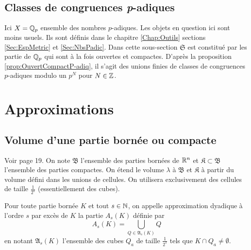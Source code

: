 \subsection{Classes de congruences \emph{p}-adiques}
Ici $X=\mathbb{Q}_p$ ensemble des nombres $p$-adiques. Les objets en question ici sont moins usuels. Ils sont définis dans le chapitre \ref{Chap:Outils} sections \ref{Sec:EspMetric} et \ref{Sec:NbsPadic}.\newline
Dans cette sous-section $\mathfrak{S}$ est constitué par les partie de $\mathbb{Q}_p$ qui sont à la fois ouvertes et compactes. D'après la proposition \ref{prop:OuvertCompactP-adiq}, il s'agit des unions finies de classes de congruences $p$-adiques modulo un $p^N$ pour $N\in \mathbb{Z}$.


\section{Approximations}\label{Sec:Approximations}

\subsection{Volume d'une partie bornée ou compacte}\label{SubSecc:Volume}
\noindent Voir page 19. On note $\mathfrak{B}$ l'ensemble des parties bornées  de $\mathbb{R}^n$ et $\mathfrak{K} \subset \mathfrak{B}$ l'ensemble des parties compactes. On étend le volume $\lambda$ à $\mathfrak{B}$ et $\mathfrak{K}$ à partir du volume défini dans les unions de cellules. On utilisera exclusivement des cellules de taille $\frac{1}{2^s}$ (essentiellement des cubes).
\begin{defi}
  Pour toute partie bornée $K$ et tout $s\in \mathbb{N}$, on appelle approximation dyadique à l'ordre $s$ par excès de $K$ la partie $A_s(K)$ définie par
\begin{displaymath}
 A_s(K) = \bigcup_{Q \in \mathfrak{A}_s(K)} Q
\end{displaymath}
en notant $\mathfrak{A}_s(K)$ l'ensemble des cubes $Q_a$ de taille $\frac{1}{2^s}$ tels que $K \cap Q_a \neq \emptyset$.
  \end{defi}

